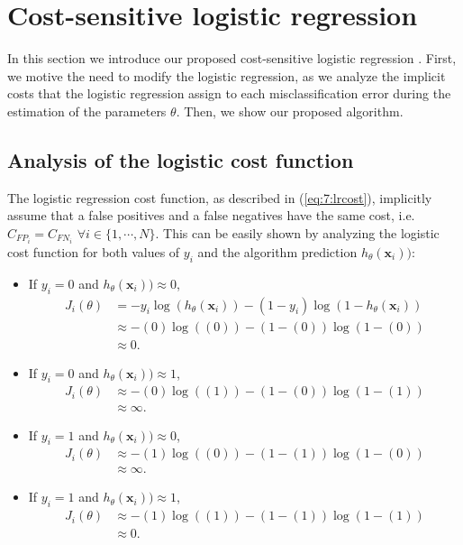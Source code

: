 \section{Cost-sensitive logistic regression}
\label{sec:7:cslr}

In this section we introduce our proposed cost-sensitive logistic regression 
\citep{CorreaBahnsen2014b}. First, we motive the need to modify the logistic regression, as we 
analyze the implicit costs that the logistic regression assign to each misclassification error 
during the estimation of the parameters $\theta$. Then, we show our proposed algorithm.


\subsection{Analysis of the logistic cost function}
\label{sec:7:log_cost_analysis}

The logistic regression cost function, as described in (\ref{eq:7:lrcost}), implicitly assume that 
a false positives and a false negatives have the same cost, i.e. $C_{{FP}_i} = C_{{FN}_i}$ $\forall 
i \in \{1,\cdots,N\}$. This can be easily shown by analyzing the logistic cost function for both 
values of $y_i$ and the algorithm prediction $h_\theta(\mathbf{x}_i))$:

\begin{itemize}
\item If $y_i=0$ and $h_\theta(\mathbf{x}_i)) \approx 0$, 
\begin{align*}
 J_i(\theta) &= -y_i\log(h_\theta(\mathbf{x}_i)) -(1-y_i)\log(1-h_\theta(\mathbf{x}_i)) \nonumber \\
 &\approx -(0)\log((0)) -(1-(0))\log(1-(0)) \nonumber \\
 &\approx 0.
\end{align*}

\item If $y_i=0$ and $h_\theta(\mathbf{x}_i)) \approx 1$, 
\begin{align*}
 J_i(\theta) &\approx -(0)\log((1)) -(1-(0))\log(1-(1)) \nonumber \\
 &\approx \infty.
\end{align*}

\item If $y_i=1$ and $h_\theta(\mathbf{x}_i)) \approx 0$, 
\begin{align*}
 J_i(\theta) &\approx -(1)\log((0)) -(1-(1))\log(1-(0)) \nonumber \\
 &\approx \infty.
\end{align*}

\item If $y_i=1$ and $h_\theta(\mathbf{x}_i)) \approx 1$, 
\begin{align*}
 J_i(\theta) &\approx -(1)\log((1)) -(1-(1))\log(1-(1)) \nonumber \\
 &\approx 0.
\end{align*}
\end{itemize}

